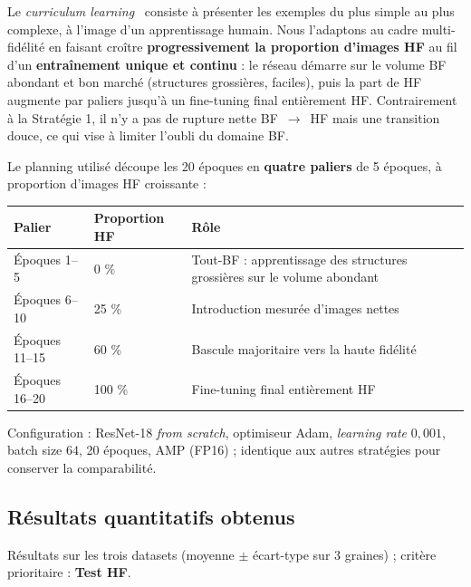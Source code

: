 \documentclass[11pt,a4paper,openany]{book}
\newcommand{\tableheadcolor}{\rowcolor{headerbg}}
\newcommand{\tablerowodd}{}
\begin{document}
Le \textit{curriculum learning}~\cite{bengio2009curriculum} consiste à présenter les exemples du plus simple au plus complexe, à l'image d'un apprentissage humain. Nous l'adaptons au cadre multi-fidélité en faisant croître \textbf{progressivement la proportion d'images HF} au fil d'un \textbf{entraînement unique et continu} : le réseau démarre sur le volume BF abondant et bon marché (structures grossières, faciles), puis la part de HF augmente par paliers jusqu'à un fine-tuning final entièrement HF. Contrairement à la Stratégie 1, il n'y a pas de rupture nette BF~$\rightarrow$~HF mais une transition douce, ce qui vise à limiter l'oubli du domaine BF.

Le planning utilisé découpe les 20 époques en \textbf{quatre paliers} de 5 époques, à proportion d'images HF croissante :

\vspace{0.6em}
\renewcommand{\arraystretch}{1.45}
\begin{tabularx}{\linewidth}{C{3cm} C{2.6cm} L{8.4cm}}
  \toprule
  \tableheadcolor
  \textbf{Palier} & \textbf{Proportion HF} & \textbf{Rôle} \\
  \midrule
  \tablerowodd
  Époques 1--5   & 0 \%   & Tout-BF : apprentissage des structures grossières sur le volume abondant \\
  Époques 6--10  & 25 \%  & Introduction mesurée d'images nettes \\
  \tablerowodd
  Époques 11--15 & 60 \%  & Bascule majoritaire vers la haute fidélité \\
  Époques 16--20 & 100 \% & Fine-tuning final entièrement HF \\
  \bottomrule
\end{tabularx}

\vspace{0.6em}
Configuration : ResNet-18 \textit{from scratch}, optimiseur Adam, \textit{learning rate} $0{,}001$, batch size $64$, 20 époques, AMP (FP16) ; identique aux autres stratégies pour conserver la comparabilité.

\subsection{Résultats quantitatifs obtenus}

Résultats sur les trois datasets (moyenne $\pm$ écart-type sur 3 graines) ; critère prioritaire : \textbf{Test HF}.
\end{document}

